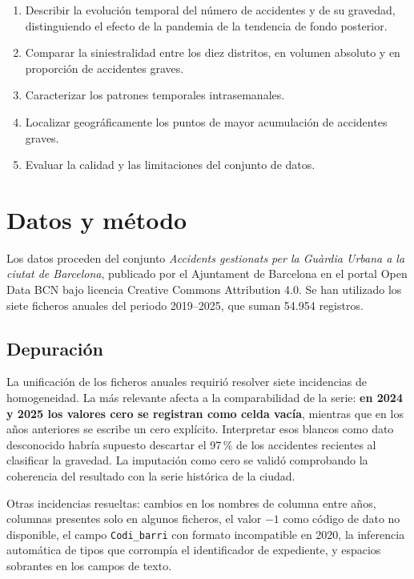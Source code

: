 \documentclass[11pt,a4paper]{article}\usepackage[]{graphicx}\usepackage[]{xcolor}
\begin{document}
\begin{enumerate}
  \item Describir la evolución temporal del número de accidentes y de su
        gravedad, distinguiendo el efecto de la pandemia de la tendencia
        de fondo posterior.
  \item Comparar la siniestralidad entre los diez distritos, en volumen
        absoluto y en proporción de accidentes graves.
  \item Caracterizar los patrones temporales intrasemanales.
  \item Localizar geográficamente los puntos de mayor acumulación de
        accidentes graves.
  \item Evaluar la calidad y las limitaciones del conjunto de datos.
\end{enumerate}

\section{Datos y método}

Los datos proceden del conjunto \textit{Accidents gestionats per la
Guàrdia Urbana a la ciutat de Barcelona}, publicado por el Ajuntament de
Barcelona en el portal Open Data BCN bajo licencia Creative Commons
Attribution 4.0. Se han utilizado los siete ficheros anuales del periodo
2019--2025, que suman 54.954 registros.

\subsection{Depuración}

La unificación de los ficheros anuales requirió resolver siete
incidencias de homogeneidad. La más relevante afecta a la comparabilidad
de la serie: \textbf{en 2024 y 2025 los valores cero se registran como
celda vacía}, mientras que en los años anteriores se escribe un cero
explícito. Interpretar esos blancos como dato desconocido habría supuesto
descartar el 97\,\% de los accidentes recientes al clasificar la gravedad.
La imputación como cero se validó comprobando la coherencia del resultado
con la serie histórica de la ciudad.

Otras incidencias resueltas: cambios en los nombres de columna entre años,
columnas presentes solo en algunos ficheros, el valor $-1$ como código de
dato no disponible, el campo \texttt{Codi\_barri} con formato incompatible
en 2020, la inferencia automática de tipos que corrompía el identificador
de expediente, y espacios sobrantes en los campos de texto.
\end{document}
